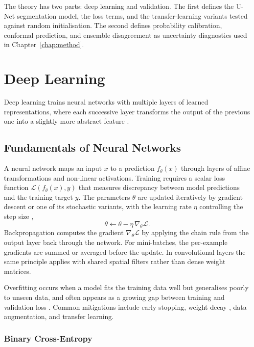 \label{chap:theory}

The theory has two parts: deep learning and validation. The first defines the U-Net segmentation model, the loss terms, and the transfer-learning variants tested against random initialisation. The second defines probability calibration, conformal prediction, and ensemble disagreement as uncertainty diagnostics used in Chapter~\ref{chap:method}.

\section{Deep Learning}
Deep learning trains neural networks with multiple layers of learned representations, where each successive layer transforms the output of the previous one into a slightly more abstract feature \cite{lecun_deep_2015}.

\subsection{Fundamentals of Neural Networks}

A neural network maps an input $x$ to a prediction $f_\theta(x)$ through layers of affine transformations and non-linear activations. Training requires a scalar loss function $\mathcal{L}(f_\theta(x), y)$ that measures discrepancy between model predictions and the training target $y$. The parameters $\theta$ are updated iteratively by gradient descent or one of its stochastic variants, with the learning rate $\eta$ controlling the step size \cite{lecun_deep_2015},
\begin{equation}
    \theta \leftarrow \theta - \eta \, \nabla_\theta \mathcal{L}.
\end{equation}
Backpropagation computes the gradient $\nabla_\theta \mathcal{L}$ by applying the chain rule from the output layer back through the network. For mini-batches, the per-example gradients are summed or averaged before the update. In convolutional layers the same principle applies with shared spatial filters rather than dense weight matrices.

Overfitting occurs when a model fits the training data well but generalises poorly to unseen data, and often appears as a growing gap between training and validation loss \cite{lecun_deep_2015}. Common mitigations include early stopping, weight decay \cite{loshchilov_decoupled_2019}, data augmentation, and transfer learning.

\subsubsection{Binary Cross-Entropy}

